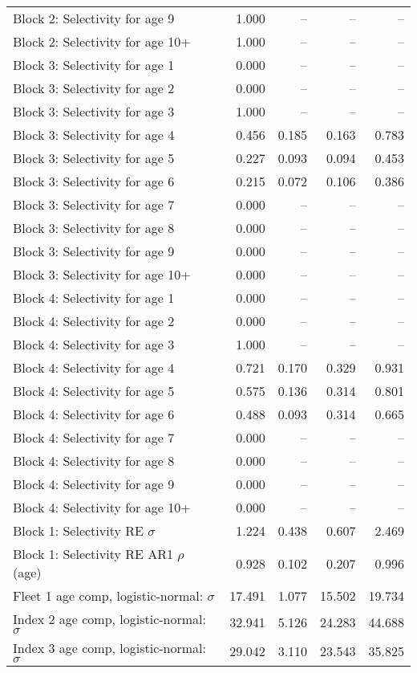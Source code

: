 \documentclass[
]{article}
\begin{document}
\begin{landscape}
\begin{longtable}[t]{lrrrr}
Block 2: Selectivity for age 9 & 1.000 & -- & -- & --\\
Block 2: Selectivity for age 10+ & 1.000 & -- & -- & --\\
Block 3: Selectivity for age 1 & 0.000 & -- & -- & --\\
Block 3: Selectivity for age 2 & 0.000 & -- & -- & --\\
Block 3: Selectivity for age 3 & 1.000 & -- & -- & --\\
\addlinespace
Block 3: Selectivity for age 4 & 0.456 & 0.185 & 0.163 & 0.783\\
Block 3: Selectivity for age 5 & 0.227 & 0.093 & 0.094 & 0.453\\
Block 3: Selectivity for age 6 & 0.215 & 0.072 & 0.106 & 0.386\\
Block 3: Selectivity for age 7 & 0.000 & -- & -- & --\\
Block 3: Selectivity for age 8 & 0.000 & -- & -- & --\\
\addlinespace
Block 3: Selectivity for age 9 & 0.000 & -- & -- & --\\
Block 3: Selectivity for age 10+ & 0.000 & -- & -- & --\\
Block 4: Selectivity for age 1 & 0.000 & -- & -- & --\\
Block 4: Selectivity for age 2 & 0.000 & -- & -- & --\\
Block 4: Selectivity for age 3 & 1.000 & -- & -- & --\\
\addlinespace
Block 4: Selectivity for age 4 & 0.721 & 0.170 & 0.329 & 0.931\\
Block 4: Selectivity for age 5 & 0.575 & 0.136 & 0.314 & 0.801\\
Block 4: Selectivity for age 6 & 0.488 & 0.093 & 0.314 & 0.665\\
Block 4: Selectivity for age 7 & 0.000 & -- & -- & --\\
Block 4: Selectivity for age 8 & 0.000 & -- & -- & --\\
\addlinespace
Block 4: Selectivity for age 9 & 0.000 & -- & -- & --\\
Block 4: Selectivity for age 10+ & 0.000 & -- & -- & --\\
Block 1: Selectivity RE $\sigma$ & 1.224 & 0.438 & 0.607 & 2.469\\
Block 1: Selectivity RE AR1 $\rho$ (age) & 0.928 & 0.102 & 0.207 & 0.996\\
Fleet 1 age comp, logistic-normal: $\sigma$ & 17.491 & 1.077 & 15.502 & 19.734\\
\addlinespace
Index 2 age comp, logistic-normal: $\sigma$ & 32.941 & 5.126 & 24.283 & 44.688\\
Index 3 age comp, logistic-normal: $\sigma$ & 29.042 & 3.110 & 23.543 & 35.825\\*
\end{longtable}
\end{landscape}
\end{document}
